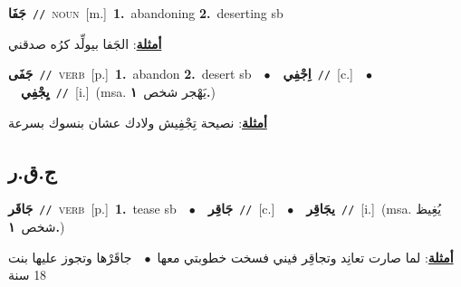\documentclass[10pt,a4paper,twoside]{article} %
\begin{document}
\begin{multicols}{2}
{\setlength\topsep{0pt}\textbf{\foreignlanguage{arabic}{جَفَا}}\ {\color{gray}\texttt{//}\color{black}}\ \textsc{noun}\ [m.]\ \textbf{1.}~abandoning  \textbf{2.}~deserting sb\  \begin{flushright}\color{gray}\foreignlanguage{arabic}{\textbf{\underline{\foreignlanguage{arabic}{أمثلة}}}: الجَفا بيولِّد كرُه صدقني}\end{flushright}\color{black}} \vspace{2mm}

{\setlength\topsep{0pt}\textbf{\foreignlanguage{arabic}{جَفَى}}\ {\color{gray}\texttt{//}\color{black}}\ \textsc{verb}\ [p.]\ \textbf{1.}~abandon  \textbf{2.}~desert sb\ \ $\bullet$\ \ \setlength\topsep{0pt}\textbf{\foreignlanguage{arabic}{اِجْفِي}}\ {\color{gray}\texttt{//}\color{black}}\ [c.]\ \ $\bullet$\ \ \setlength\topsep{0pt}\textbf{\foreignlanguage{arabic}{يِجْفِي}}\ {\color{gray}\texttt{//}\color{black}}\ [i.]\ \color{gray}(msa. \foreignlanguage{arabic}{يَهْجر شخص}~\foreignlanguage{arabic}{\textbf{١.}})\color{black}\  \begin{flushright}\color{gray}\foreignlanguage{arabic}{\textbf{\underline{\foreignlanguage{arabic}{أمثلة}}}: نصيحة تِجْفِيش ولادك عشان بنسوك بسرعة}\end{flushright}\color{black}} \vspace{2mm}

\vspace{-3mm}
\subsection*{\color{blue}\foreignlanguage{arabic}{ج.ق.ر}\color{blue}{}} 

{\setlength\topsep{0pt}\textbf{\foreignlanguage{arabic}{جَاقَر}}\ {\color{gray}\texttt{//}\color{black}}\ \textsc{verb}\ [p.]\ \textbf{1.}~tease sb\ \ $\bullet$\ \ \setlength\topsep{0pt}\textbf{\foreignlanguage{arabic}{جَاقِر}}\ {\color{gray}\texttt{//}\color{black}}\ [c.]\ \ $\bullet$\ \ \setlength\topsep{0pt}\textbf{\foreignlanguage{arabic}{يجَاقِر}}\ {\color{gray}\texttt{//}\color{black}}\ [i.]\ \color{gray}(msa. \foreignlanguage{arabic}{يُغِيظ شخص}~\foreignlanguage{arabic}{\textbf{١.}})\color{black}\  \begin{flushright}\color{gray}\foreignlanguage{arabic}{\textbf{\underline{\foreignlanguage{arabic}{أمثلة}}}: لما صارت تعانِد وتجاقِر فيني فسخت خطوبتي معها\ $\bullet$\ \  جاقَرْها وتجوز عليها بنت 18 سنة}\end{flushright}\color{black}} \vspace{2mm}


\end{multicols}
\end{document}
